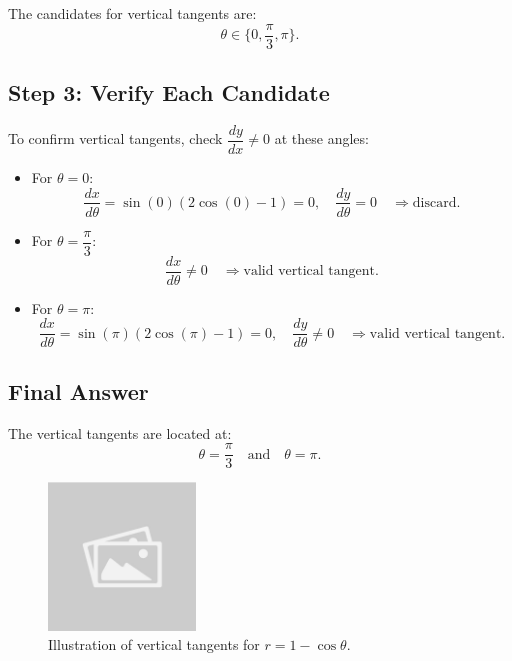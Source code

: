 \documentclass{article}
\begin{document}
\begin{examplebox}
\begin{solutionbox}
The candidates for vertical tangents are:
\[
    \theta \in \{ 0, \dfrac{\pi}{3}, \pi \}.
\]

\subsection*{Step 3: Verify Each Candidate}
To confirm vertical tangents, check \( \dfrac{dy}{dx} \neq 0 \) at these angles:
\begin{itemize}
    \item For \( \theta = 0 \):
    \[
        \dfrac{dx}{d\theta} = \sin(0)(2\cos(0) - 1) = 0, \quad 
        \dfrac{dy}{d\theta} = 0 \quad \Rightarrow \text{discard}.
    \]
    \item For \( \theta = \dfrac{\pi}{3} \):
    \[
        \dfrac{dx}{d\theta} \neq 0 \quad \Rightarrow \text{valid vertical tangent}.
    \]
    \item For \( \theta = \pi \):
    \[
        \dfrac{dx}{d\theta} = \sin(\pi)(2\cos(\pi) - 1) = 0, \quad 
        \dfrac{dy}{d\theta} \neq 0 \quad \Rightarrow \text{valid vertical tangent}.
    \]
\end{itemize}

\subsection*{Final Answer}
\begin{answerbox}
The vertical tangents are located at:
\[
    \theta = \dfrac{\pi}{3} \quad \text{and} \quad \theta = \pi.
\]
\end{answerbox}

\end{solutionbox}

\begin{figure}[H]
    \centering
    \includegraphics[width=0.35\textwidth]{sample_image.jpg}
    \caption{Illustration of vertical tangents for \( r = 1 - \cos\theta \).}
    \label{fig:vertical_tangents}
\end{figure}

\end{examplebox}
\end{document}
